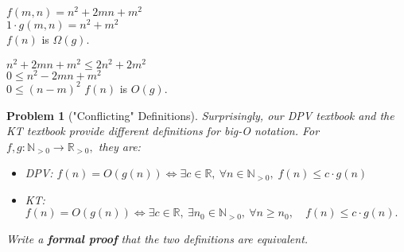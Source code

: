 \documentclass[10pt]{article}
\newtheorem{problem}{\sc\color{cit}Problem}
\begin{document}
{\begin{enumerate}[(a)]
{            $ f(m, n) = n^2 + 2mn + m^2 $ \\
            $ 1 \cdot g(m, n) = n^2 + m^2 $ \\
            $f(n)$ is $\Omega(g)$. 

            $n^2 + 2mn + m^2 \leq 2n^2 + 2m^2 $ \\
            $0 \leq n^2 - 2mn + m^2 $ \\
            $0 \leq (n - m)^2 $
            $f(n)$ is $O(g)$. 
        }

    \end{enumerate}
}

\newpage





\begin{problem}["Conflicting" Definitions]
Surprisingly, our DPV textbook and the KT textbook provide different definitions for big-O notation. For $f,g: \mathbb{N}_{>0} \to \mathbb{R}_{> 0},$ they are:
\begin{itemize}
    \item DPV: $f(n) = O(g(n)) \iff \exists c \in \mathbb{R}, \: \forall n \in \mathbb{N}_{>0},\;  f(n) \leq c \cdot g(n)$ 
    \item KT: $f(n) = O(g(n)) \iff \exists c \in \mathbb{R}, \: \exists n_0 \in \mathbb{N}_{>0}, \: \forall n \geq n_0, \quad f(n) \leq c \cdot g(n).$
\end{itemize}
Write a \textbf{formal proof} that the two definitions are equivalent.

\end{problem}
\end{document}
